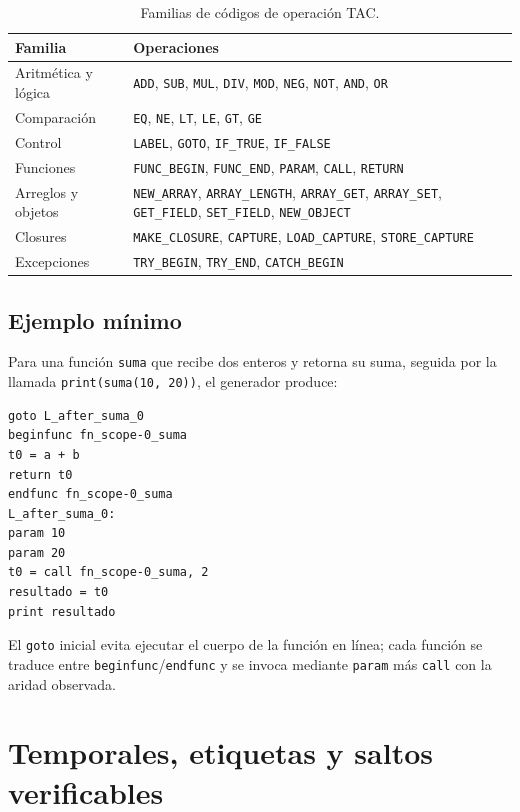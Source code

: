 \documentclass[11pt,letterpaper,oneside]{report}
\newcommand{\codigo}[1]{\texttt{#1}}
\begin{document}
\begin{table}[H]
\centering
\begin{tabularx}{\textwidth}{lY}
\toprule
Familia & Operaciones \\
\midrule
Aritmética y lógica & \codigo{ADD}, \codigo{SUB}, \codigo{MUL}, \codigo{DIV},
  \codigo{MOD}, \codigo{NEG}, \codigo{NOT}, \codigo{AND}, \codigo{OR} \\
Comparación & \codigo{EQ}, \codigo{NE}, \codigo{LT}, \codigo{LE}, \codigo{GT},
  \codigo{GE} \\
Control & \codigo{LABEL}, \codigo{GOTO}, \codigo{IF\_TRUE}, \codigo{IF\_FALSE} \\
Funciones & \codigo{FUNC\_BEGIN}, \codigo{FUNC\_END}, \codigo{PARAM}, \codigo{CALL},
  \codigo{RETURN} \\
Arreglos y objetos & \codigo{NEW\_ARRAY}, \codigo{ARRAY\_LENGTH},
  \codigo{ARRAY\_GET}, \codigo{ARRAY\_SET}, \codigo{GET\_FIELD}, \codigo{SET\_FIELD},
  \codigo{NEW\_OBJECT} \\
Closures & \codigo{MAKE\_CLOSURE}, \codigo{CAPTURE}, \codigo{LOAD\_CAPTURE},
  \codigo{STORE\_CAPTURE} \\
Excepciones & \codigo{TRY\_BEGIN}, \codigo{TRY\_END}, \codigo{CATCH\_BEGIN} \\
\bottomrule
\end{tabularx}
\caption{Familias de códigos de operación TAC.}
\end{table}

\section{Ejemplo mínimo}

Para una función \codigo{suma} que recibe dos enteros y retorna su suma, seguida
por la llamada \codigo{print(suma(10, 20))}, el generador produce:

\begin{verbatim}
goto L_after_suma_0
beginfunc fn_scope-0_suma
t0 = a + b
return t0
endfunc fn_scope-0_suma
L_after_suma_0:
param 10
param 20
t0 = call fn_scope-0_suma, 2
resultado = t0
print resultado
\end{verbatim}

El \codigo{goto} inicial evita ejecutar el cuerpo de la función en línea; cada
función se traduce entre \codigo{beginfunc}/\codigo{endfunc} y se invoca mediante
\codigo{param} más \codigo{call} con la aridad observada.

\chapter{Temporales, etiquetas y saltos verificables}
\end{document}
